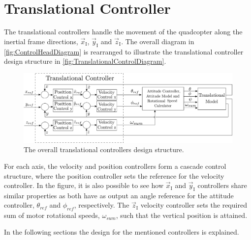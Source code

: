 \section{Translational Controller} \label{sec:TranslationalController}

The translational controllers handle the movement of the quadcopter along the inertial frame directions, $\vec{x}_{\mathrm{I}}$, $\vec{y}_{\mathrm{I}}$ and $\vec{z}_{\mathrm{I}}$. The overall diagram in \autoref{fig:ControlHeadDiagram} is rearranged to illustrate the translational controller design structure in \autoref{fig:TranslationalControlDiagram}.
%
\begin{figure}[H]
	\centering
	\includegraphics[scale=0.25]{figures/TranslationalControlDiagram}
	\caption{The overall translational controllers design structure.}
	\label{fig:TranslationalControlDiagram}
\end{figure}
%
For each axis, the velocity and position controllers form a cascade control structure, where the position controller sets the reference for the velocity controller. In the figure, it is also possible to see how $\vec{x}_{\mathrm{I}}$ and $\vec{y}_{\mathrm{I}}$ controllers share similar properties as both have as output an angle reference for the attitude controller, $\theta_{ref}$ and $\phi_{ref}$, respectively. 
The $\vec{z}_{\mathrm{I}}$ velocity controller sets the required sum of motor rotational speeds, $\omega_{sum}$, such that the vertical position is attained.

In the following sections the design for the mentioned controllers is explained.